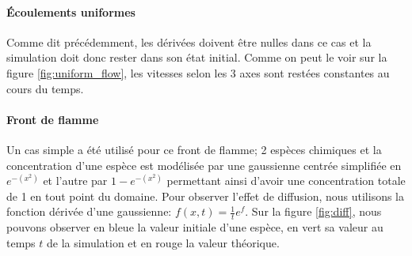 \paragraph{Écoulements uniformes}
Comme dit précédemment, les dérivées doivent être nulles dans ce cas et la simulation doit donc rester dans son état initial. Comme on peut le voir sur la figure \ref{fig:uniform_flow}, les vitesses selon les 3 axes sont restées constantes au cours du temps.
 

\paragraph{Front de flamme}
Un cas simple a été utilisé pour ce front de flamme; 2 espèces chimiques et la concentration d'une espèce est modélisée par une gaussienne centrée simplifiée en $e^{-(x^2)}$ et l'autre par $1-e^{-(x^2)}$ permettant ainsi d'avoir une concentration totale de 1 en tout point du domaine. Pour observer l'effet de diffusion, nous utilisons la fonction dérivée d'une gaussienne: $f(x,t)=\frac{1}{t}e^{f}$. Sur la figure \ref{fig:diff}, nous pouvons observer en bleue la valeur initiale d'une espèce, en vert sa valeur au temps $t$ de la simulation et en rouge la valeur théorique.





